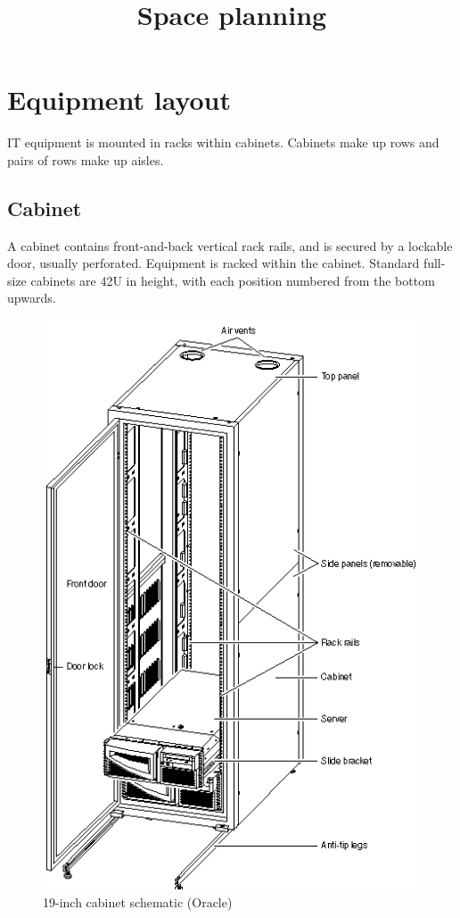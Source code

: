 \documentclass{pgnotes}
\title{Space planning}
\begin{document}
\maketitle

\section{Equipment layout}

IT equipment is mounted in racks within cabinets.
Cabinets make up rows and pairs of rows make up aisles.

\subsection{Cabinet}

A cabinet contains front-and-back vertical rack rails, and is secured by a lockable door, usually perforated.
Equipment is racked within the cabinet.
Standard full-size cabinets are 42U in height, with each position numbered from the bottom upwards.

\begin{figure}[htbp]
  \centering
  \includegraphics[width=1.0\linewidth,height=0.8\paperheight,keepaspectratio]{cabinet}
  \caption{19-inch cabinet schematic (Oracle)}
  \label{fig:cabinet}
\end{figure}
\end{document}
